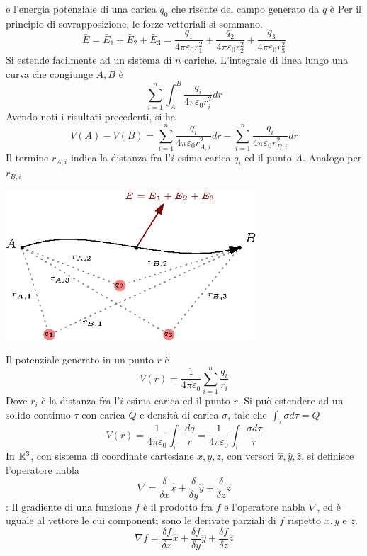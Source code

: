 \documentclass[10pt, letterpaper]{report}
\begin{document}
e l'energia potenziale di una carica $q_0$ che risente del campo generato da $q$ è 
Per il principio di sovrapposizione, le forze vettoriali si sommano. 
$$ \bar E = \bar E_1+\bar E_2 +\bar E_3 =\frac{q_1}{4\pi\varepsilon_0r_1^2}+ 
\frac{q_2}{4\pi\varepsilon_0r_2^2} + 
\frac{q_3}{4\pi\varepsilon_0r_3^2}$$
Si estende facilmente ad un sistema di $n$ cariche. L'integrale di linea lungo una curva che congiunge $A,B$ è 
$$\sum_{i=1}^n\int_A^B  \frac{q_i}{4\pi\varepsilon_0r_i^2}dr$$ 
Avendo noti i risultati precedenti, si ha  
$$ V(A)-V(B)=\sum_{i=1}^n \frac{q_i}{4\pi\varepsilon_0r_{A,i}^2}dr-\sum_{i=1}^n \frac{q_i}{4\pi\varepsilon_0r_{B,i}^2}dr$$
Il termine $r_{A,i}$ indica la distanza fra l'$i$-esima carica $q_i$ ed il punto $A$. Analogo per $r_{B,i}$
\begin{center}
    \includegraphics[width=0.7\textwidth]{images/sistemaCariche.eps}
\end{center}
Il potenziale generato in un punto $r$ è 
$$ V(r)=\frac{1}{4\pi\varepsilon_0}\sum_{i=1}^n\frac{q_i}{r_i}$$
Dove $r_i$ è la distanza fra l'$i$-esima carica ed il punto $r$. Si può estendere ad un solido continuo $\tau$ con carica $Q$ e  densità di carica $\sigma$, tale che $\int_{\tau}\sigma d\tau=Q$
$$ V(r)=\frac{1}{4\pi\varepsilon_0}\int_{\tau}\frac{dq}{r}=\frac{1}{4\pi\varepsilon_0}\int_{\tau}\frac{\sigma d\tau}{r}$$
 In ${\mathbb R}^3$, con sistema di coordinate cartesiane $x,y,z$, con versori  $\hat x,\hat y,\hat z$, si definisce l'operatore nabla 
$$ \nabla = \dfrac{\delta}{\delta x}\hat x+\dfrac{\delta}{\delta y}\hat y+\dfrac{\delta}{\delta z}\hat z$$
 : Il gradiente di una funzione $f$ è il prodotto fra $f$ e l'operatore nabla $\nabla$, ed è uguale al vettore le cui componenti sono le derivate parziali di $f$ rispetto $x,y$ e $z$. 
$$ \nabla f = \dfrac{\delta f}{\delta x}\hat x+\dfrac{\delta f}{\delta y}\hat y+\dfrac{\delta f}{\delta z}\hat z$$
\end{document}
